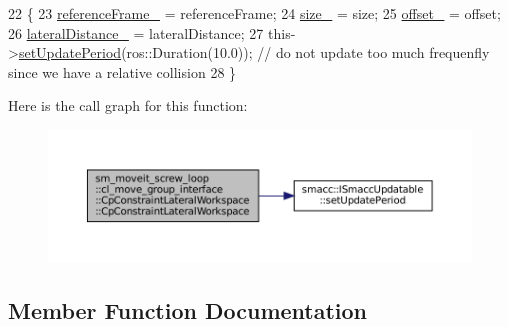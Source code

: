 \begin{DoxyCode}
22         \{
23             \hyperlink{classsm__moveit__screw__loop_1_1cl__move__group__interface_1_1CpConstraintLateralWorkspace_a495d9c8cd671b823dc5939ba8c073784}{referenceFrame\_} = referenceFrame;
24             \hyperlink{classsm__moveit__screw__loop_1_1cl__move__group__interface_1_1CpConstraintLateralWorkspace_a2942f50928bd8fd89fb01a58d8009e99}{size\_} = size;
25             \hyperlink{classsm__moveit__screw__loop_1_1cl__move__group__interface_1_1CpConstraintLateralWorkspace_a62250fed9f73d59fa21442e53a950705}{offset\_} = offset;
26             \hyperlink{classsm__moveit__screw__loop_1_1cl__move__group__interface_1_1CpConstraintLateralWorkspace_ab53ee652f1567ac4837e438bf97a93a6}{lateralDistance\_} = lateralDistance;
27             this->\hyperlink{classsmacc_1_1ISmaccUpdatable_a88f3b092a81b2d8810a9776c8c69855b}{setUpdatePeriod}(ros::Duration(10.0)); \textcolor{comment}{// do not update too much frequenfly
       since we have a relative collision}
28         \}
\end{DoxyCode}
Here is the call graph for this function\+:
\nopagebreak
\begin{figure}[H]
\begin{center}
\leavevmode
\includegraphics[width=350pt]{classsm__moveit__screw__loop_1_1cl__move__group__interface_1_1CpConstraintLateralWorkspace_a37065320fffc1d241bb90965671919c2_cgraph}
\end{center}
\end{figure}


\subsection{Member Function Documentation}
\mbox{\label{classsm__moveit__screw__loop_1_1cl__move__group__interface_1_1CpConstraintLateralWorkspace_acd85865e3dab3df429cee9fedf7c9f3c}} 

